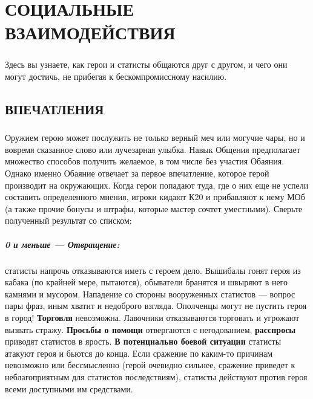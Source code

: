 \chapter{СОЦИАЛЬНЫЕ ВЗАИМОДЕЙСТВИЯ}
\paragraph{}
Здесь вы узнаете, как герои и статисты общаются друг с другом, и чего они могут достичь, не прибегая к бескомпромиссному насилию.
\section{ВПЕЧАТЛЕНИЯ}
\paragraph{}
Оружием герою может послужить не только верный меч или могучие чары, но и вовремя сказанное слово или лучезарная улыбка. Навык Общения предполагает множество способов получить желаемое, в том числе без участия Обаяния. Однако именно Обаяние отвечает за первое впечатление, которое герой производит на окружающих. Когда герои попадают туда, где о них еще не успели составить определенного мнения, игроки кидают К20 и прибавляют к нему МОб (а также прочие бонусы и штрафы, которые мастер сочтет уместными). Сверьте полученный результат со списком:
\paragraph{0 и меньше — Отвращение:} статисты напрочь отказываются иметь с героем дело. Вышибалы гонят героя из кабака (по крайней мере, пытаются), обыватели бранятся и швыряют в него камнями и мусором. Нападение со стороны вооруженных статистов — вопрос пары фраз, иным хватит и недоброго взгляда. Ополченцы могут не пустить героя в город!
\newline
\textbf{Торговля} невозможна. Лавочники отказываются торговать и угрожают вызвать стражу.
\newline
\textbf{Просьбы о помощи} отвергаются с негодованием, \textbf{расспросы} приводят статистов в ярость.
\newline
\textbf{В потенциально боевой ситуации} статисты атакуют героя и бьются до конца. Если сражение по каким-то причинам невозможно или бессмысленно (герой очевидно сильнее, сражение приведет к неблагоприятным для статистов последствиям), статисты действуют против героя всеми доступными им средствами.
